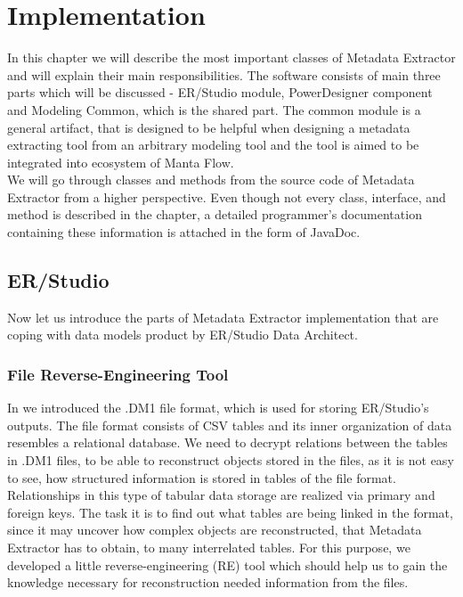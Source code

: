 \chapter{Implementation}
\label{implementation}

In this chapter we will describe the most important classes of Metadata Extractor and will explain their main responsibilities. The software consists of main three parts which will be discussed - ER/Studio module, PowerDesigner component and Modeling Common, which is the shared part. 
The common module is a general artifact, that is designed to be helpful when designing a metadata extracting tool from an arbitrary modeling tool and the tool is aimed to be integrated into ecosystem of Manta Flow. \\

We will go through classes and methods from the source code of Metadata Extractor from a higher perspective. 
Even though not every class, interface, and method is described in the chapter, a detailed programmer's documentation containing these information is attached in the form of JavaDoc.

\section{ER/Studio}

Now let us introduce the parts of Metadata Extractor implementation that are coping with data models product by ER/Studio Data Architect.

\subsection{File Reverse-Engineering Tool}
\label{subsec:dm1_tool}

In  we introduced the .DM1 file format, which is used for storing ER/Studio's outputs.
The file format consists of CSV tables and its inner organization of data resembles a relational database.
We need to decrypt relations between the tables in .DM1 files, to be able to reconstruct objects stored in the files, as it is not easy to see, how structured information is stored in tables of the file format.
Relationships in this type of tabular data storage are realized via primary and foreign keys.
The task it is to find out what tables are being linked in the format, since it may uncover how complex objects are reconstructed, that Metadata Extractor has to obtain, to many interrelated tables.
For this purpose, we developed a little reverse-engineering (RE) tool which should help us to gain the knowledge necessary for reconstruction needed information from the files. \\

